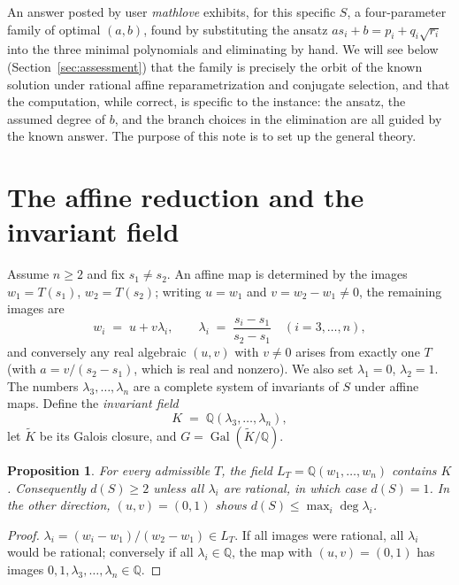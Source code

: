 \documentclass[11pt]{article}
\newtheorem{proposition}[theorem]{Proposition}
\theoremstyle{definition}
\theoremstyle{remark}
\newcommand{\Q}{\mathbb{Q}}
\newcommand{\Gal}{\operatorname{Gal}}
\newcommand{\Kt}{\widetilde{K}}
\begin{document}
An answer posted by user \emph{mathlove} exhibits, for this specific $S$, a four-parameter
family of optimal $(a,b)$, found by substituting the ansatz $a s_i + b = p_i + q_i \sqrt{r_i}$
into the three minimal polynomials and eliminating by hand. We will see below
(Section~\ref{sec:assessment}) that the family is precisely the orbit of the known solution
under rational affine reparametrization and conjugate selection, and that the computation,
while correct, is specific to the instance: the ansatz, the assumed degree of $b$, and the
branch choices in the elimination are all guided by the known answer. The purpose of this note
is to set up the general theory.

\section{The affine reduction and the invariant field}\label{sec:reduction}

Assume $n \ge 2$ and fix $s_1 \neq s_2$. An affine map is determined by the images
$w_1 = T(s_1)$, $w_2 = T(s_2)$; writing $u = w_1$ and $v = w_2 - w_1 \neq 0$, the remaining
images are
\begin{equation}\label{eq:affine}
w_i \;=\; u + v \lambda_i, \qquad
\lambda_i \;=\; \frac{s_i - s_1}{s_2 - s_1} \quad (i = 3, \dots, n),
\end{equation}
and conversely any real algebraic $(u, v)$ with $v \neq 0$ arises from exactly one $T$
(with $a = v/(s_2 - s_1)$, which is real and nonzero). We also set $\lambda_1 = 0$,
$\lambda_2 = 1$. The numbers $\lambda_3, \dots, \lambda_n$ are a complete system of invariants
of $S$ under affine maps. Define the \emph{invariant field}
\[
K \;=\; \Q(\lambda_3, \dots, \lambda_n),
\]
let $\Kt$ be its Galois closure, and $G = \Gal(\Kt/\Q)$.

\begin{proposition}\label{prop:bounds}
For every admissible $T$, the field $L_T = \Q(w_1, \dots, w_n)$ contains $K$. Consequently
$d(S) \ge 2$ unless all $\lambda_i$ are rational, in which case $d(S) = 1$. In the other
direction, $(u, v) = (0, 1)$ shows $d(S) \le \max_i \deg \lambda_i$.
\end{proposition}

\begin{proof}
$\lambda_i = (w_i - w_1)/(w_2 - w_1) \in L_T$. If all images were rational, all $\lambda_i$
would be rational; conversely if all $\lambda_i \in \Q$, the map with $(u,v) = (0,1)$ has
images $0, 1, \lambda_3, \dots, \lambda_n \in \Q$.
\end{proof}
\end{document}
